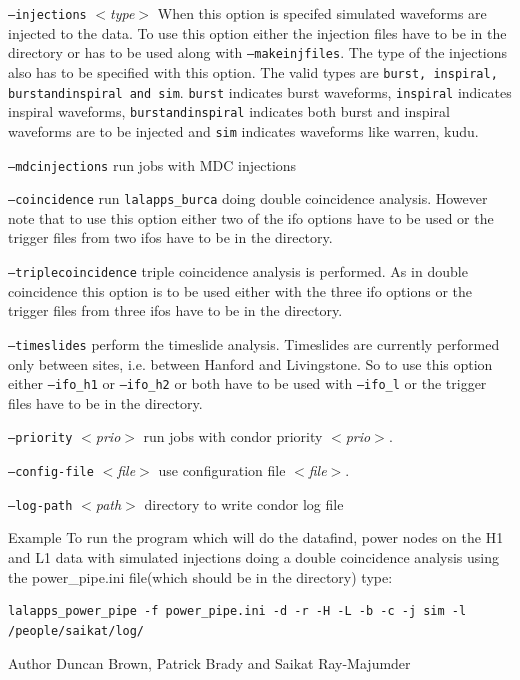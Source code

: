 \documentclass{article}
\newcommand{\prog}[1]{\texttt{#1}}
\newcommand{\option}[1]{\texttt{#1}}
\newcommand{\parm}[1]{$<$\textit{#1}$>$}
\newenvironment{entry}%
  {\begin{list}{}{\renewcommand{\makelabel}[1]%
    {\parbox[b]{\labelwidth}{\makebox[0pt][l]{\textbf{##1}}\\}}%
    \setlength{\labelwidth}{1em}%
    \setlength{\labelsep}{1em}%
    \setlength{\leftmargin}{2em}%
    \setlength{\topsep}{\medskipamount}%
    \setlength{\itemsep}{\medskipamount}%
    \setlength{\parsep}{\medskipamount}%
    \setlength{\listparindent}{0pt}}}
  {\end{list}}
\begin{document}
\begin{entry}
\begin{entry}
\item[\option{--injections} \parm{type}] When this option is specifed 
simulated waveforms are injected to the data.  To use this option either
the injection files have to be in the directory or has to be used along with
\option{--makeinjfiles}.  The type of the injections also has to be specified 
with this option. The valid types are \texttt{burst, inspiral, burstandinspiral
and sim}.  \texttt{burst} indicates burst waveforms, \texttt{inspiral} 
indicates inspiral waveforms, \texttt{burstandinspiral} indicates both
burst and inspiral waveforms are to be injected and \texttt{sim} indicates
waveforms like warren,  kudu.

\item[\option{--mdcinjections}] run jobs with MDC injections      

\item[\option{--coincidence}] run \prog{lalapps\_burca} doing double 
coincidence analysis.  However note that to use this option either
two of the ifo options have to be used or the trigger files from two ifos 
have to be in the directory.

\item[\option{--triplecoincidence}] triple coincidence analysis is performed.  
As in double coincidence this option is to be used
either with the three ifo options or the trigger files from three ifos have
to be in the directory.

\item[\option{--timeslides}] perform the timeslide analysis. Timeslides
are currently performed only between sites, i.e. between Hanford and 
Livingstone. So to use this option either \option{--ifo\_h1} or 
\option{--ifo\_h2} or both have to be used with \option{--ifo\_l} or the 
trigger files have to be in the directory. 

\item[\option{--priority} \parm{prio}] run jobs with condor priority
\parm{prio}.

\item[\option{--config-file} \parm{file}] use configuration file
\parm{file}.

\item[\option{--log-path} \parm{path}] directory to write condor log file

\end{entry}


\item[Example]
To run the program which will do the datafind,  power nodes on the H1
and L1 data with simulated injections doing a double coincidence analysis
using the power\_pipe.ini file(which should be in the directory) type:
\begin{verbatim}
lalapps_power_pipe -f power_pipe.ini -d -r -H -L -b -c -j sim -l /people/saikat/log/
\end{verbatim}

\item[Author]
Duncan Brown, Patrick Brady and Saikat Ray-Majumder
\end{entry}
\end{document}
